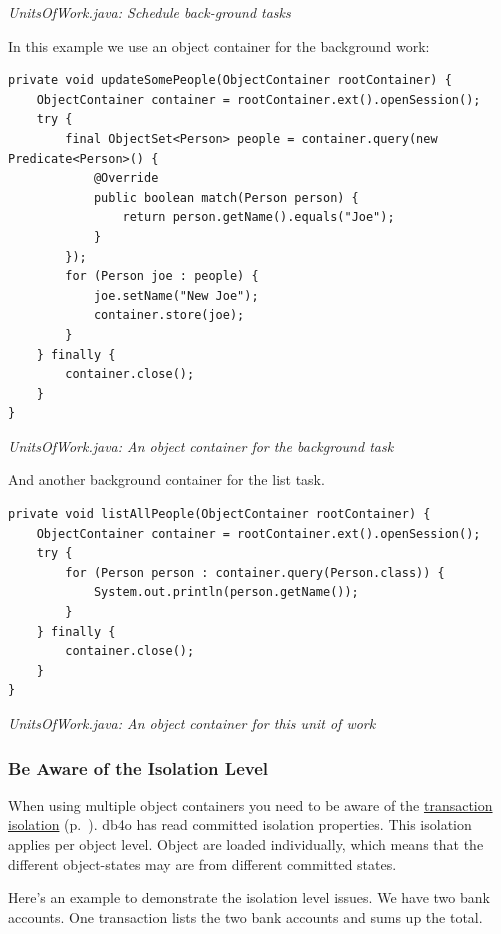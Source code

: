 {\small\itshape UnitsOfWork.java: Schedule back-ground tasks\par}
\medskip

In this example we use an object container for the background work:

\begin{lstlisting}
private void updateSomePeople(ObjectContainer rootContainer) {
    ObjectContainer container = rootContainer.ext().openSession();
    try {
        final ObjectSet<Person> people = container.query(new Predicate<Person>() {
            @Override
            public boolean match(Person person) {
                return person.getName().equals("Joe");
            }
        });
        for (Person joe : people) {
            joe.setName("New Joe");
            container.store(joe);
        }
    } finally {
        container.close();
    }
}
\end{lstlisting}

{\small\itshape UnitsOfWork.java: An object container for the background task\par}
\medskip

And another background container for the list task.

\begin{lstlisting}
private void listAllPeople(ObjectContainer rootContainer) {
    ObjectContainer container = rootContainer.ext().openSession();
    try {
        for (Person person : container.query(Person.class)) {
            System.out.println(person.getName());
        }
    } finally {
        container.close();
    }
}
\end{lstlisting}

{\small\itshape UnitsOfWork.java: An object container for this unit of work\par}
\medskip

\subsubsection*{Be Aware of the Isolation Level}

When using multiple object containers you need to be aware of the \hyperref[ref:basics-acid-and-transactions-isolation]{transaction isolation} (p.~\pageref{ref:basics-acid-and-transactions-isolation}). db4o has read committed isolation properties. This isolation applies per object level. Object are loaded individually, which means that the different object-states may are from different committed states.

Here's an example to demonstrate the isolation level issues. We have two bank accounts. One transaction lists the two bank accounts and sums up the total.

